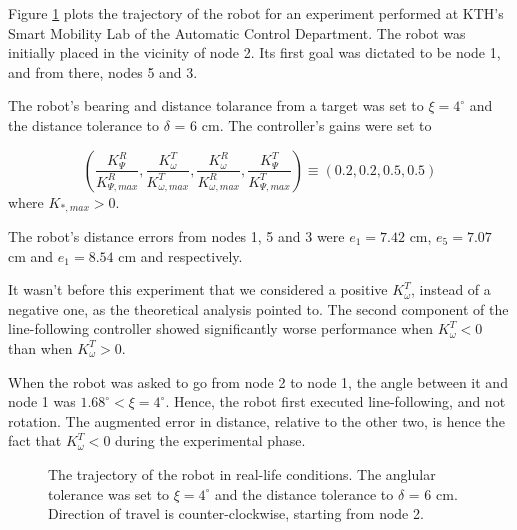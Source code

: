 Figure \ref{fig:22_map_7} plots the trajectory of the robot for an experiment
performed at KTH's Smart Mobility Lab of the Automatic Control Department. The
robot was initially placed in the vicinity of node 2. Its first goal was
dictated to be node 1, and from there, nodes 5 and 3.

The robot's bearing and distance tolarance from a target was set to
$\xi = 4^{\circ}$ and the distance tolerance to $\delta$ = 6 cm. The controller's
gains were set to

$$(\dfrac{K_{\Psi}^R}{K_{\Psi,max}^R}, \dfrac{K_{\omega}^T}{K_{\omega, max}^T}, \dfrac{K_{\omega}^R}{K_{\omega,max}^R}, \dfrac{K_{\Psi}^T}{K_{\Psi,max}^T})
\equiv (0.2, 0.2, 0.5, 0.5)$$
where $K_{*,max} > 0$.

The robot's distance errors from nodes 1, 5 and 3 were $e_1 = 7.42$ cm,
$e_5 = 7.07$ cm and $e_1 = 8.54$ cm and respectively.

It wasn't before this experiment that we considered a
positive $K_{\omega}^T$, instead of a negative one, as the theoretical analysis
pointed to. The second component of the line-following controller showed
significantly worse performance when $K_{\omega}^T < 0$ than when $K_{\omega}^T > 0$.

When the robot was asked to go from node 2 to node 1, the angle between it and
node 1 was $1.68^{\circ} < \xi = 4^{\circ}$. Hence, the robot first executed
line-following, and not rotation. The augmented error in distance,
relative to the other two, is hence the fact that $K_{\omega}^T < 0$ during the
experimental phase.

\begin{figure}[H]\centering
  \scalebox{1}{}
  \caption{The trajectory of the robot in real-life conditions. The anglular
    tolerance was set to $\xi = 4^{\circ}$ and the distance tolerance to
    $\delta$ = 6 cm. Direction of travel is counter-clockwise, starting from node 2.}
  \label{fig:22_map_7}
\end{figure}
